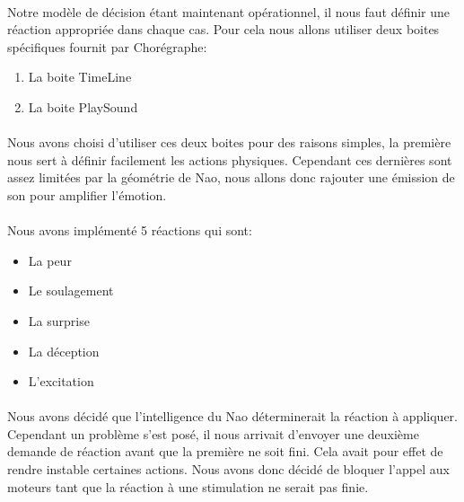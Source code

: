 \paragraph{}
Notre modèle de décision étant maintenant opérationnel, il nous faut définir une
réaction appropriée dans chaque cas. Pour cela nous allons utiliser deux boites
spécifiques fournit par Chorégraphe:\\
\begin{enumerate}
  \item La boite TimeLine
  \item La boite PlaySound
\end{enumerate}

\paragraph{}
Nous avons choisi d'utiliser ces deux boites pour des raisons simples, la
première nous sert à définir facilement les actions physiques. Cependant ces
dernières sont assez limitées par la géométrie de Nao, nous allons donc rajouter
une émission de son pour amplifier l'émotion.

\paragraph{}
Nous avons implémenté 5 réactions qui sont:\\
\begin{itemize}
  \item La peur
  \item Le soulagement
  \item La surprise
  \item La déception
  \item L'excitation
\end{itemize}


\paragraph{}
Nous avons décidé que l'intelligence du Nao déterminerait la réaction à
appliquer. Cependant un problème s'est posé, il nous arrivait d'envoyer une
deuxième demande de réaction avant que la première ne soit fini. Cela avait pour
effet de rendre instable certaines actions. Nous avons donc décidé de bloquer
l'appel aux moteurs tant que la réaction à une stimulation ne serait pas finie.
